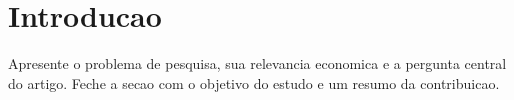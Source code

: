 \section{Introducao}

Apresente o problema de pesquisa, sua relevancia economica e a pergunta central do artigo. Feche a secao com o objetivo do estudo e um resumo da contribuicao.